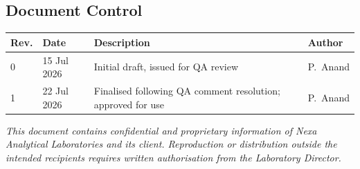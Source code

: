 \vspace{10pt}

\subsection*{Document Control}
\begin{table}[h!]
\centering
\small
\begin{tabularx}{\linewidth}{@{}llXl@{}}
\toprule
\textbf{Rev.} & \textbf{Date} & \textbf{Description} & \textbf{Author} \\
\midrule
0 & 15 Jul 2026 & Initial draft, issued for QA review & P.\ Anand \\
1 & 22 Jul 2026 & Finalised following QA comment resolution; approved for use & P.\ Anand \\
\bottomrule
\end{tabularx}
\end{table}

\vspace{2pt}
{\footnotesize\color{nexagray}\itshape
This document contains confidential and proprietary information of Nexa Analytical
Laboratories and its client. Reproduction or distribution outside the intended
recipients requires written authorisation from the Laboratory Director.}
